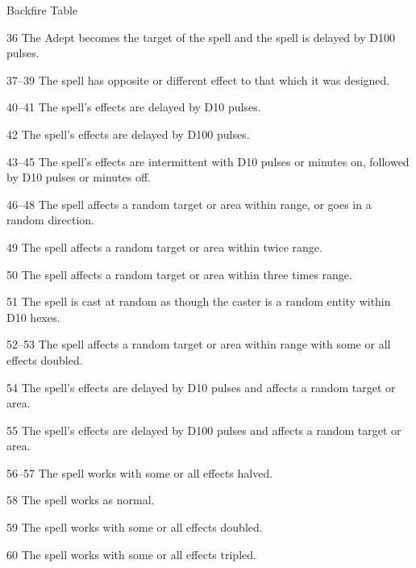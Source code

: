 \begin{Chapter}{Backfire Table}
\begin{Description}
\item[36] The Adept becomes the target of the spell and the spell is
  delayed by D100 pulses.

\item[37–39] The spell has opposite or different effect to that which
  it was designed.

\item[40–41] The spell’s effects are delayed by D10 pulses.

\item[42] The spell’s effects are delayed by D100 pulses.

\item[43–45] The spell’s effects are intermittent with D10 pulses or
  minutes on, followed by D10 pulses or minutes off.

\item[46–48] The spell affects a random target or area within range,
  or goes in a random direction.

\item[49] The spell affects a random target or area within twice
  range.

\item[50] The spell affects a random target or area within three times
  range.

\item[51] The spell is cast at random as though the caster is a random
  entity within D10 hexes.

\item[52–53] The spell affects a random target or area within range
  with some or all effects doubled.

\item[54] The spell’s effects are delayed by D10 pulses and affects a
  random target or area.

\item[55] The spell’s effects are delayed by D100 pulses and affects a
  random target or area.

\item[56–57] The spell works with some or all effects halved.

\item[58] The spell works as normal.

\item[59] The spell works with some or all effects doubled.

\item[60] The spell works with some or all effects tripled.

\end{Description}



\end{Chapter}
